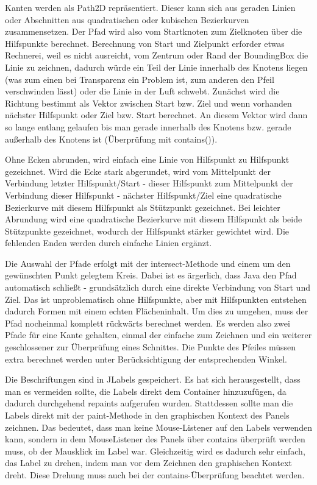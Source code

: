 Kanten werden als Path2D repräsentiert. Dieser kann sich aus geraden Linien oder Abschnitten aus quadratischen oder kubischen Bezierkurven zusammensetzen. Der Pfad wird also vom Startknoten zum Zielknoten über die Hilfspunkte berechnet. Berechnung von Start und Zielpunkt erforder etwas Rechnerei, weil es nicht ausreicht, vom Zentrum oder Rand der BoundingBox die Linie zu zeichnen, dadurch würde ein Teil der Linie innerhalb des Knotens liegen (was zum einen bei Transparenz ein Problem ist, zum anderen den Pfeil verschwinden lässt) oder die Linie in der Luft schwebt. Zunächst wird die Richtung bestimmt als Vektor zwischen Start bzw. Ziel und wenn vorhanden nächster Hilfspunkt oder Ziel bzw. Start berechnet. An diesem Vektor wird dann so lange entlang gelaufen bis man gerade innerhalb des Knotens bzw. gerade außerhalb des Knotens ist (Überprüfung mit contains()).

Ohne Ecken abrunden, wird einfach eine Linie von Hilfspunkt zu Hilfspunkt gezeichnet. Wird die Ecke stark abgerundet, wird vom Mittelpunkt der Verbindung letzter Hilfspunkt/Start - dieser Hilfspunkt zum Mittelpunkt der Verbindung dieser Hilfspunkt - nächster Hilfspunkt/Ziel eine quadratische Bezierkurve mit diesem Hilfspunkt als Stützpunkt gezeichnet. Bei leichter Abrundung wird eine quadratische Bezierkurve mit diesem Hilfspunkt als beide Stützpunkte gezeichnet, wodurch der Hilfspunkt stärker gewichtet wird. Die fehlenden Enden werden durch einfache Linien ergänzt.

Die Auswahl der Pfade erfolgt mit der intersect-Methode und einem um den gewünschten Punkt gelegtem Kreis. Dabei ist es ärgerlich, dass Java den Pfad automatisch schließt - grundsätzlich durch eine direkte Verbindung von Start und Ziel. Das ist unproblematisch ohne Hilfspunkte, aber mit Hilfspunkten entstehen dadurch Formen mit einem echten Flächeninhalt. Um dies zu umgehen, muss der Pfad nocheinmal komplett rückwärts berechnet werden. Es werden also zwei Pfade für eine Kante gehalten, einmal der einfache zum Zeichnen und ein weiterer geschlossener zur Überprüfung eines Schnittes. Die Punkte des Pfeiles müssen extra berechnet werden unter Berücksichtigung der entsprechenden Winkel.

Die Beschriftungen sind in JLabels gespeichert. Es hat sich herausgestellt, dass man es vermeiden sollte, die Labels direkt dem Container hinzuzufügen, da dadurch durchgehend repaints aufgerufen wurden. Stattdessen sollte man die Labels direkt mit der paint-Methode in den graphischen Kontext des Panels zeichnen. Das bedeutet, dass man keine Mouse-Listener auf den Labels verwenden kann, sondern in dem MouseListener des Panels über contains überprüft werden muss, ob der Mausklick im Label war. Gleichzeitig wird es dadurch sehr einfach, das Label zu drehen, indem man vor dem Zeichnen den graphischen Kontext dreht. Diese Drehung muss auch bei der contains-Überprüfung beachtet werden.
